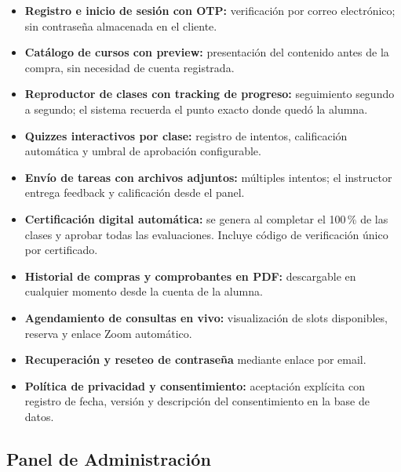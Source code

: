 \documentclass[a4paper,11pt]{article}
\begin{document}
\begin{itemize}[leftmargin=1.6em, itemsep=3pt]
  \item \textbf{Registro e inicio de sesi\'on con OTP:}
        verificaci\'on por correo electr\'onico; sin contrase\~na almacenada en el cliente.
  \item \textbf{Cat\'alogo de cursos con preview:}
        presentaci\'on del contenido antes de la compra, sin necesidad de cuenta registrada.
  \item \textbf{Reproductor de clases con tracking de progreso:}
        seguimiento segundo a segundo; el sistema recuerda el punto exacto
        donde qued\'o la alumna.
  \item \textbf{Quizzes interactivos por clase:}
        registro de intentos, calificaci\'on autom\'atica y umbral de aprobaci\'on configurable.
  \item \textbf{Env\'io de tareas con archivos adjuntos:}
        m\'ultiples intentos; el instructor entrega feedback y calificaci\'on desde el panel.
  \item \textbf{Certificaci\'on digital autom\'atica:}
        se genera al completar el 100\,\% de las clases y aprobar todas las evaluaciones.
        Incluye c\'odigo de verificaci\'on \'unico por certificado.
  \item \textbf{Historial de compras y comprobantes en PDF:}
        descargable en cualquier momento desde la cuenta de la alumna.
  \item \textbf{Agendamiento de consultas en vivo:}
        visualizaci\'on de slots disponibles, reserva y enlace Zoom autom\'atico.
  \item \textbf{Recuperaci\'on y reseteo de contrase\~na} mediante enlace por email.
  \item \textbf{Pol\'itica de privacidad y consentimiento:}
        aceptaci\'on expl\'icita con registro de fecha, versi\'on y descripci\'on
        del consentimiento en la base de datos.
\end{itemize}

\subsection{Panel de Administraci\'on}
\end{document}
